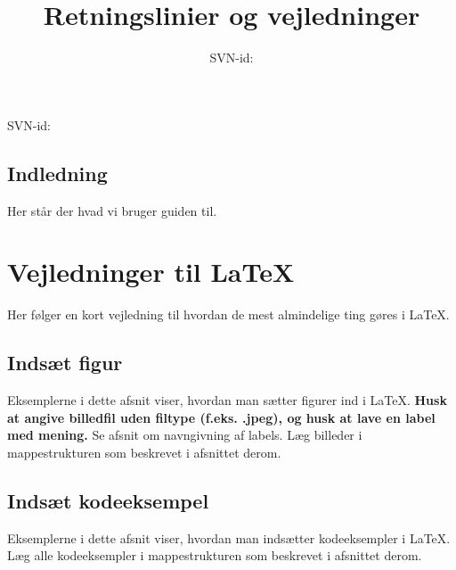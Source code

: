 \documentclass[simple,final]{../mypaper}
\title{Retningslinier og vejledninger}
\date{SVN-id: \SVNId}
\begin{document}
{
\Huge \flushright \bfseries \thetitle
}
{
\flushright SVN-id: \SVNId
}


\tableofcontents*


\section{Indledning}

Her står der hvad vi bruger guiden til.



\chapter{Vejledninger til \LaTeX}

Her følger en kort vejledning til hvordan de mest almindelige ting
gøres i \LaTeX .

\section{Indsæt figur}

Eksemplerne i dette afsnit viser, hvordan man sætter figurer ind i
\LaTeX . \textbf{Husk at angive billedfil uden filtype (f.eks. .jpeg),
  og husk at lave en label med mening.} Se afsnit om navngivning af
labels. Læg billeder i mappestrukturen som beskrevet i afsnittet
derom.






\section{Indsæt kodeeksempel}

Eksemplerne i dette afsnit viser, hvordan man indsætter kodeeksempler
i \LaTeX . Læg alle kodeeksempler i mappestrukturen som beskrevet i
afsnittet derom.


\end{document}
